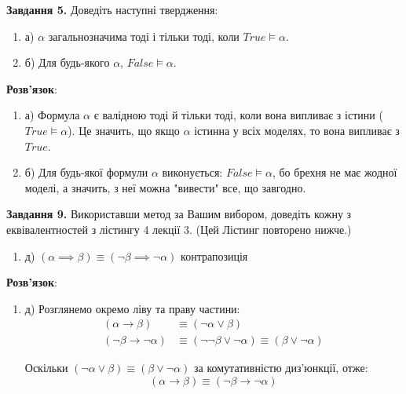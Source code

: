 \documentclass[a4paper,14pt]{extarticle} %
\begin{document}
\newpage
\textbf{Завдання 5.} Доведіть наступні твердження:

\begin{enumerate}[label=]
    \item а) $\alpha$ загальнозначима тоді і тільки тоді, коли $True \models \alpha$.
    \item б) Для будь-якого $\alpha$, $False \models \alpha$.
\end{enumerate}

\textbf{Розв'язок}:
\begin{enumerate}[label=]
    \item а) Формула $\alpha$ є валідною тоді й тільки тоді, коли вона випливає з істини
        ($True \models \alpha$). Це значить, що якщо $\alpha$ істинна у всіх моделях,
        то вона випливає з $True$.
    \item б) Для будь-якої формули $\alpha$ виконується: $False \models \alpha$, бо брехня
        не має жодної моделі, а значить, з неї можна "вивести" все, що завгодно.
\end{enumerate}

\vspace{1cm} %
\textbf{Завдання 9.} Використавши метод за Вашим вибором, доведіть кожну з
еквівалентностей з лістингу 4 лекції 3. (Цей Лістинг повторено нижче.)
\begin{enumerate}[label=]
    \item д) $(\alpha \implies \beta) \equiv (\neg \beta \implies \neg \alpha)$ контрапозиція
\end{enumerate}

\textbf{Розв'язок}:
\begin{enumerate}[label=]
    \item д) Розглянемо окремо ліву та праву частини:
\[
\begin{aligned}
(\alpha \rightarrow \beta) &\equiv (\neg \alpha \lor \beta) \\
(\neg \beta \rightarrow \neg \alpha) &\equiv (\neg \neg \beta \lor \neg \alpha) \equiv (\beta \lor \neg \alpha)
\end{aligned}
\]

Оскільки \((\neg \alpha \lor \beta) \equiv (\beta \lor \neg \alpha)\) за комутативністю диз'юнкції, отже:
\[
(\alpha \rightarrow \beta) \equiv (\neg \beta \rightarrow \neg \alpha)
\]
\end{enumerate}
\end{document}
